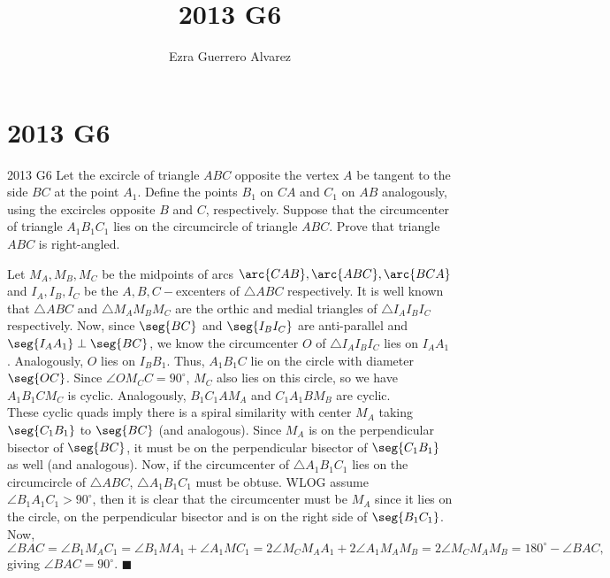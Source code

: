 \documentclass[14pt]{article}
\title{2013 G6}
\author{Ezra Guerrero Alvarez}
\begin{document}
\maketitle
	
\section*{2013 G6}

\begin{statement}{2013 G6}
	Let the excircle of triangle $ABC$ opposite
	the vertex $A$ be tangent to the side $BC$ at the point $A_1$.
	Define the points $B_1$ on $CA$ and $C_1$ on $AB$ analogously,
	using the excircles opposite $B$ and $C$, respectively.
	Suppose that the circumcenter of triangle $A_1B_1C_1$ lies
	on the circumcircle of triangle $ABC$.
	Prove that triangle $ABC$ is right-angled.
\end{statement}
Let $M_A, M_B, M_C$ be the midpoints of arcs $\arc{CAB}, \arc{ABC}, \arc{BCA}$ and $I_A,I_B,I_C$ be the $A,B,C-$excenters of $\triangle ABC$ respectively. It is well known that $\triangle ABC$ and $\triangle M_AM_BM_C$ are the orthic and medial triangles of $\triangle I_AI_BI_C$ respectively. Now, since $\seg{BC}$ and $\seg{I_BI_C}$ are anti-parallel and $\seg{I_AA_1}\perp\seg{BC}$, we know the circumcenter $O$ of $\triangle I_AI_BI_C$ lies on $I_AA_1$. Analogously, $O$ lies on $I_BB_1$. Thus, $A_1B_1C$ lie on the circle with diameter $\seg{OC}$. Since $\angle OM_CC=90^{\circ}$, $M_C$ also lies on this circle, so we have $A_1B_1CM_C$ is cyclic. Analogously, $B_1C_1AM_A$ and $C_1A_1BM_B$ are cyclic. \\
These cyclic quads imply there is a spiral similarity with center $M_A$ taking $\seg{C_1B_1}$ to $\seg{BC}$ (and analogous). Since $M_A$ is on the perpendicular bisector of $\seg{BC}$, it must be on the perpendicular bisector of $\seg{C_1B_1}$ as well (and analogous). Now, if the circumcenter of $\triangle A_1B_1C_1$ lies on the circumcircle of $\triangle ABC$, $\triangle A_1B_1C_1$ must be obtuse. WLOG assume $\angle B_1A_1C_1>90^\circ$, then it is clear that the circumcenter must be $M_A$ since it lies on the circle, on the perpendicular bisector and is on the right side of $\seg{B_1C_1}$. Now, 
\[ \angle BAC = \angle B_1M_AC_1 = \angle B_1MA_1 +\angle A_1MC_1 = 2\angle M_CM_AA_1 + 2\angle A_1M_AM_B = 2\angle M_CM_AM_B = 180^\circ-\angle BAC, \]
giving $\angle BAC=90^\circ$. $\blacksquare$ 
	
\end{document}
